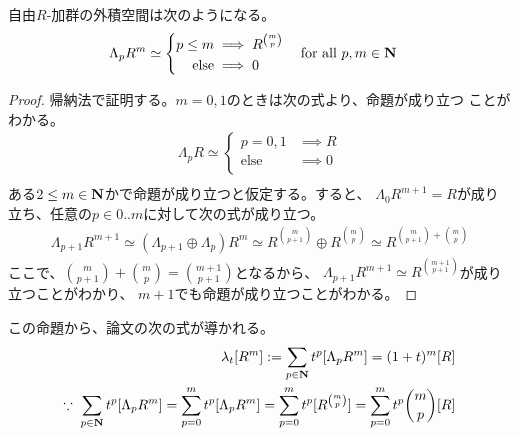 {	\begin{proposition}[自由加群の外積]\label{prop:自由加群の外積} %
		自由$R$-加群の外積空間は次のようになる。
		\begin{equation*}\begin{split}
			\Lambda_pR^m &\simeq \left\{\begin{split}
				p\le m &\implies R^{\binom{m}{p}} \\
				\text{else} &\implies 0 \\
			\end{split}\right. \quad\text{for all } p,m\in\mathbf{N}
		\end{split}\end{equation*}
	\end{proposition} %
	\begin{proof} 帰納法で証明する。$m=0,1$のときは次の式より、命題が成り立つ
	ことがわかる。
	\begin{equation*}\begin{split}
		\Lambda_pR \simeq \left\{\begin{split}
			p=0,1 &\implies R \\
			\text{else} &\implies 0 \\
		\end{split}\right. \\ %
	\end{split}\end{equation*}
	ある$2\le m\in\mathbf{N}$かで命題が成り立つと仮定する。すると、
	$\Lambda_0R^{m+1}=R$が成り立ち、任意の$p\in0..m$に対して次の式が成り立つ。
	\begin{equation*}\begin{split}
		\Lambda_{p+1}R^{m+1} \simeq (\Lambda_{p+1}\oplus\Lambda_p)R^m
		\simeq R^{\binom{m}{p+1}}\oplus R^{\binom{m}{p}}
		\simeq R^{\binom{m}{p+1}+\binom{m}{p}}
	\end{split}\end{equation*}
	ここで、$\binom{m}{p+1}+\binom{m}{p}=\binom{m+1}{p+1}$となるから、
	$\Lambda_{p+1}R^{m+1}\simeq R^{\binom{m+1}{p+1}}$が成り立つことがわかり、
	$m+1$でも命題が成り立つことがわかる。
	\end{proof}

	この命題から、論文\cite{Grayson1978Gro}の次の式が導かれる。
	\begin{equation*}\begin{split}
		\lambda_t[R^m] := \sum_{p\in\mathbf{N}}t^p[\Lambda_pR^m] = (1 + t)^m[R] \\
		\because\; \sum_{p\in\mathbf{N}}t^p[\Lambda_pR^m]
		= \sum_{p=0}^mt^p[\Lambda_pR^m]
		= \sum_{p=0}^mt^p[R^{\binom{m}{p}}]
		= \sum_{p=0}^mt^p\binom{m}{p}[R]
	\end{split}\end{equation*}
	} %
\endgroup %
